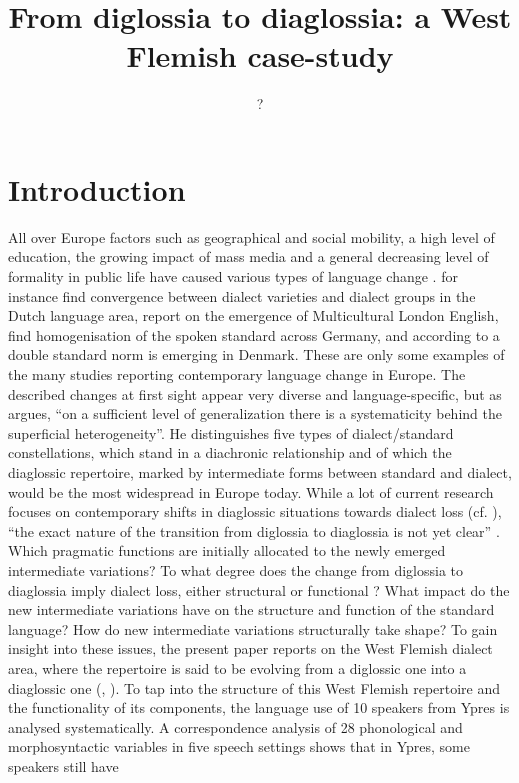 \documentclass[output=paper]{LSP/langsci}
\author{?\affiliation{??}}
\title{From diglossia to diaglossia: a West Flemish case-study}
\begin{document}
\newcommand{\ghysvara}{\textsuperscript{[-st,+ypr]~~}}
\newcommand{\ghysvarb}{\textsuperscript{[+st,+ypr]~~}}
\newcommand{\ghysvarc}{\textsuperscript{[-st,-ypr]~~}}
\newcommand{\ghysvard}{\textsuperscript{[+st,-ypr]~~}}

\newcommand{\tabitem}{{\textbullet}~~}
 
 

\section{Introduction}

All over Europe factors such as geographical and social mobility, a high level of education, the growing impact of mass media and a general decreasing level of formality in public life have caused various types of language change \citep[355]{taeldeman_linguistic_2009}. \citet{heeringa_convergence_2014} for instance find convergence between dialect varieties and dialect groups in the Dutch language area, \citet{cheshire_contact_2011} report on the emergence of Multicultural London English, \citet{auer_demotisation_2011} find homogenisation of the spoken standard across Germany, and according to \citet{kristiansen_two_2001} a double standard norm is emerging in Denmark. These are only some examples of the many studies reporting contemporary language change in Europe. The described changes at first sight appear very diverse and language-specific, but as \citet[7]{auer_europes_2005} argues, “on a sufficient level of generalization there is a systematicity behind the superficial heterogeneity”. He distinguishes five types of dialect/standard constellations, which stand in a diachronic relationship and of which the diaglossic repertoire, marked by intermediate forms between standard and dialect, would be the most widespread in Europe today. While a lot of current research focuses on contemporary shifts in diaglossic situations towards dialect loss (cf. \citealt{ghyselen_impact_2013,grondelaers_standard_2011,vandekerckhove_dialect_2009}), “the exact nature of the transition from diglossia to diaglossia is not yet clear” \citep[23]{auer_europes_2005}. Which pragmatic functions are initially allocated to the newly emerged intermediate variations? To what degree does the change from diglossia to diaglossia imply dialect loss, either structural or functional \citep{auer_convergence_1996}? What impact do the new intermediate variations have on the structure and function of the standard language? How do new intermediate variations structurally take shape? To gain insight into these issues, the present paper reports on the West Flemish dialect area, where the repertoire is said to be evolving from a diglossic one into a diaglossic one (\citealt{de_caluwe_tussentaal_2009}, \citealt[272]{willemyns_-standardization_2007}). To tap into the structure of this West Flemish repertoire and the functionality of its components, the language use of 10 speakers from Ypres is analysed systematically. A correspondence analysis of 28 phonological and morphosyntactic variables in five speech settings shows that in Ypres, some speakers still have 
\end{document}
